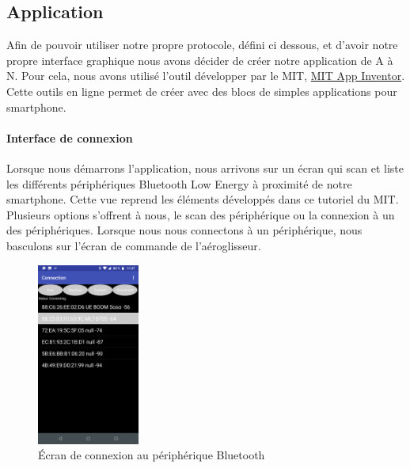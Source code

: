			\subsection{Application}
			Afin de pouvoir utiliser notre propre protocole, défini ci dessous, et d'avoir notre propre interface graphique nous avons décider de créer notre application de A à N. Pour cela, nous avons utilisé l'outil développer par le MIT, \href{http://ai2.appinventor.mit.edu/}{MIT App Inventor}. Cette outils en ligne permet de créer avec des blocs de simples applications pour smartphone.
		\paragraph{Interface de connexion} Lorsque nous démarrons l'application, nous arrivons sur un écran qui scan et liste les différents périphériques Bluetooth Low Energy à proximité de notre smartphone. Cette vue reprend les éléments développés dans ce tutoriel \cite{tutoBLE} du MIT. Plusieurs options s'offrent à nous, le scan des périphérique ou la connexion à un des périphériques. Lorsque nous nous connectons à un périphérique, nous basculons sur l'écran de commande de l'aéroglisseur.
		\begin{figure}
			\begin{center}
				\includegraphics[width=0.3\textwidth]{../Illus/AppConnection.png}
			\end{center}
			\caption{Écran de connexion au périphérique Bluetooth}
		\end{figure}
